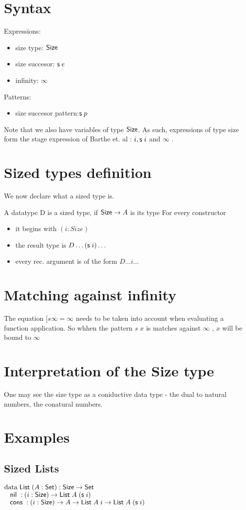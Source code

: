 \section{Syntax}

Expressions:
\begin{itemize}
\item
size type: $ \mathsf{Size} $ 
\item
size succesor: $\mathsf{s}\; e $ 
\item
infinity: $\infty$ 
\end{itemize}
Patterns:
\begin{itemize}
\item
size succesor pattern:$ \mathsf{s}\; p $ 
\end{itemize}
Note that we also have variables of type $\mathsf{Size}$.
As such, expressions of type size form the stage expression of Barthe et. al :  $ i , \mathsf{s}\; i $ and $ \infty $ .
\section{Sized types definition}
We now declare what a sized type is.
\begin{definition}
A datatype D is a sized type, if $ \mathsf{Size} \rightarrow A $ is its type
For every constructor 
\begin{itemize}
\item
it begins with $(i: Size)$
\item
the result type is $D \dots (\mathsf{s}\; i) \dots $
\item
every rec. argument is of the form $ D \dots i \dots $
\end{itemize}
\end{definition}
\section{Matching against infinity}
The equation 
$[ s \infty = \infty $
needs to be taken into account when evaluating a function application.
So whhen the pattern $ s \; x $ is matches against $ \infty $ , $x$ will be bound to $ \infty $  
\section{Interpretation of the Size type}
One may see the size type as a coniductive data type - the dual to natural numbers, the conatural numbers.
\section{Examples}
\subsection{Sized Lists}
\begin{bsp}
$\mathrm{data}\; \mathsf{List}\; ( A : \mathsf{Set} ) : \mathsf{Size} \rightarrow \mathsf{Set} $ \\
$\hspace*{3mm} \mathsf{nil}\; : ( i : \mathsf{Size} ) \rightarrow{ \mathsf{List}\;A \; (\mathsf{s}\;i)} $\\
$\hspace*{3mm} \mathsf{cons}\; : ( i : \mathsf{Size} ) \rightarrow{ A \rightarrow\mathsf{List}\;A \; i \rightarrow\mathsf{List}\;A \; (\mathsf{s}\;i)} $
\end{bsp}

